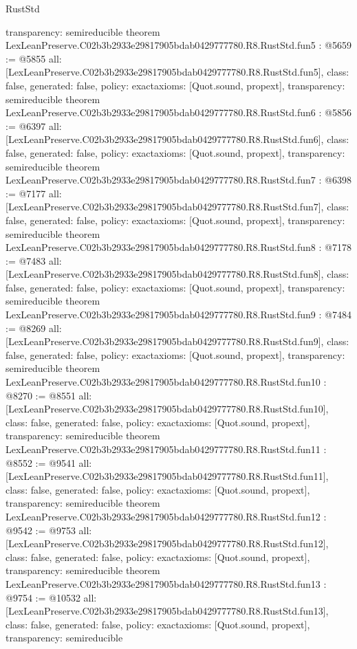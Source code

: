 \begin{lexlean}{RustStd}
\begin{coremodule}
{  transparency: semireducible
}
theorem LexLeanPreserve.C02b3b2933e29817905bdab0429777780.R8.RustStd.fun5 : @5659 := @5855 {
  all: [LexLeanPreserve.C02b3b2933e29817905bdab0429777780.R8.RustStd.fun5],
  class: false,
  generated: false,
  policy: exact{axioms: [Quot.sound, propext]},
  transparency: semireducible
}
theorem LexLeanPreserve.C02b3b2933e29817905bdab0429777780.R8.RustStd.fun6 : @5856 := @6397 {
  all: [LexLeanPreserve.C02b3b2933e29817905bdab0429777780.R8.RustStd.fun6],
  class: false,
  generated: false,
  policy: exact{axioms: [Quot.sound, propext]},
  transparency: semireducible
}
theorem LexLeanPreserve.C02b3b2933e29817905bdab0429777780.R8.RustStd.fun7 : @6398 := @7177 {
  all: [LexLeanPreserve.C02b3b2933e29817905bdab0429777780.R8.RustStd.fun7],
  class: false,
  generated: false,
  policy: exact{axioms: [Quot.sound, propext]},
  transparency: semireducible
}
theorem LexLeanPreserve.C02b3b2933e29817905bdab0429777780.R8.RustStd.fun8 : @7178 := @7483 {
  all: [LexLeanPreserve.C02b3b2933e29817905bdab0429777780.R8.RustStd.fun8],
  class: false,
  generated: false,
  policy: exact{axioms: [Quot.sound, propext]},
  transparency: semireducible
}
theorem LexLeanPreserve.C02b3b2933e29817905bdab0429777780.R8.RustStd.fun9 : @7484 := @8269 {
  all: [LexLeanPreserve.C02b3b2933e29817905bdab0429777780.R8.RustStd.fun9],
  class: false,
  generated: false,
  policy: exact{axioms: [Quot.sound, propext]},
  transparency: semireducible
}
theorem LexLeanPreserve.C02b3b2933e29817905bdab0429777780.R8.RustStd.fun10 : @8270 := @8551 {
  all: [LexLeanPreserve.C02b3b2933e29817905bdab0429777780.R8.RustStd.fun10],
  class: false,
  generated: false,
  policy: exact{axioms: [Quot.sound, propext]},
  transparency: semireducible
}
theorem LexLeanPreserve.C02b3b2933e29817905bdab0429777780.R8.RustStd.fun11 : @8552 := @9541 {
  all: [LexLeanPreserve.C02b3b2933e29817905bdab0429777780.R8.RustStd.fun11],
  class: false,
  generated: false,
  policy: exact{axioms: [Quot.sound, propext]},
  transparency: semireducible
}
theorem LexLeanPreserve.C02b3b2933e29817905bdab0429777780.R8.RustStd.fun12 : @9542 := @9753 {
  all: [LexLeanPreserve.C02b3b2933e29817905bdab0429777780.R8.RustStd.fun12],
  class: false,
  generated: false,
  policy: exact{axioms: [Quot.sound, propext]},
  transparency: semireducible
}
theorem LexLeanPreserve.C02b3b2933e29817905bdab0429777780.R8.RustStd.fun13 : @9754 := @10532 {
  all: [LexLeanPreserve.C02b3b2933e29817905bdab0429777780.R8.RustStd.fun13],
  class: false,
  generated: false,
  policy: exact{axioms: [Quot.sound, propext]},
  transparency: semireducible
}
\end{coremodule}
\end{lexlean}
